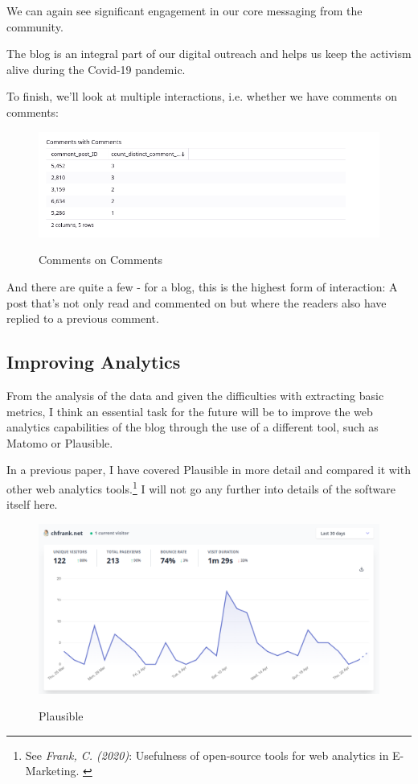 We can again see significant engagement in our core messaging from the community. 

The blog is an integral part of our digital outreach and helps us keep the activism alive during the Covid-19 pandemic.

To finish, we'll look at multiple interactions, i.e. whether we have comments on comments:

\begin{figure}[H]
\centering
\caption {Comments on Comments}
\includegraphics[width=\linewidth]{images/figure19.png}
\label{fig:commentsComment}
\end{figure}

And there are quite a few - for a blog, this is the highest form of interaction: A post that's not only read and commented on but where the readers also have replied to a previous comment.

\subsection{Improving Analytics}

From the analysis of the data and given the difficulties with extracting basic metrics, I think an essential task for the future will be to improve the web analytics capabilities of the blog through the use of a different tool, such as Matomo or Plausible.

In a previous paper, I have covered Plausible in more detail and compared it with other web analytics tools.\footnote{See \textit{Frank, C. (2020)}: Usefulness of open-source tools for web analytics in E-Marketing. \cite{previousPaper}} I will not go any further into details of the software itself here.

\begin{figure}[H]
\centering
\caption {Plausible}
\includegraphics[width=\linewidth]{images/plausible.png}
\label{fig:plausible}
\end{figure}

